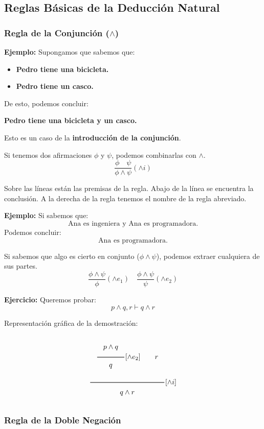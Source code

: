 \subsection{Reglas Básicas de la Deducción Natural}

\subsubsection{Regla de la Conjunción (\(\wedge\))}

\noindent \textbf{Ejemplo:} Supongamos que sabemos que:
\begin{itemize}
    \item \textbf{Pedro tiene una bicicleta.}
    \item \textbf{Pedro tiene un casco.}
\end{itemize}
De esto, podemos concluir:
\begin{center}
    \textbf{Pedro tiene una bicicleta y un casco.}
\end{center}
Esto es un caso de la \textbf{introducción de la conjunción}.

\begin{tcolorbox}[colframe=blue!60, colback=blue!5, title=\textbf{Regla de Introducción de la Conjunción}]
Si tenemos dos afirmaciones \(\phi\) y \(\psi\), podemos combinarlas con \(\land\).
\[
\frac{\phi \quad \psi}{\phi \wedge \psi} (\wedge i)
\]
\end{tcolorbox}
Sobre las líneas están las premisas de la regla.  Abajo de la línea se encuentra la conclusión.  
A la derecha de la regla tenemos el nombre de la regla abreviado.

\noindent \textbf{Ejemplo:}  
Si sabemos que:
\[
\text{Ana es ingeniera y Ana es programadora.}
\]
Podemos concluir:
\[
\text{Ana es programadora.}
\]
\begin{tcolorbox}[colframe=red!60, colback=red!5, title=\textbf{Regla de Eliminación de la Conjunción}]
Si sabemos que algo es cierto en conjunto (\(\phi \wedge \psi\)), podemos extraer cualquiera de sus partes.
\[
\frac{\phi \wedge \psi}{\phi} (\wedge e_1) \quad
\frac{\phi \wedge \psi}{\psi} (\wedge e_2)
\]
\end{tcolorbox}

\noindent \textbf{Ejercicio:} 
Queremos probar:
\[
p \wedge q, r \vdash q \wedge r
\]

Representación gráfica de la demostración:
\[
\Rulee{\Rulee{p \wedge q}{q}{\wedge e_2} \qquad r}{
q \wedge r}{\wedge i}
\]


\subsubsection{Regla de la Doble Negación}

